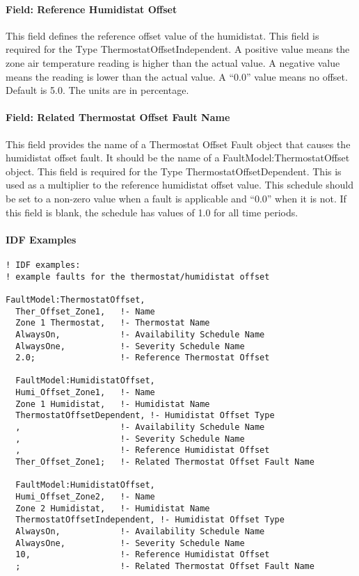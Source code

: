 \paragraph{Field: Reference Humidistat Offset}\label{field-reference-humidistat-offset}

This field defines the reference offset value of the humidistat. This field is required for the Type ThermostatOffsetIndependent. A positive value means the zone air temperature reading is higher than the actual value. A negative value means the reading is lower than the actual value. A ``0.0'' value means no offset. Default is 5.0. The units are in percentage.

\paragraph{Field: Related Thermostat Offset Fault Name}\label{field-related-thermostat-offset-fault-name}

This field provides the name of a Thermostat Offset Fault object that causes the humidistat offset fault. It should be the name of a FaultModel:ThermostatOffset object. This field is required for the Type ThermostatOffsetDependent. This is used as a multiplier to the reference humidistat offset value. This schedule should be set to a non-zero value when a fault is applicable and ``0.0'' when it is not. If this field is blank, the schedule has values of 1.0 for all time periods.

\paragraph{IDF Examples}\label{an-example-of-idf-codes-for-the-thermostathumidistat-offset-fault-models}

\begin{lstlisting}
! IDF examples:
! example faults for the thermostat/humidistat offset

FaultModel:ThermostatOffset,
  Ther_Offset_Zone1,   !- Name
  Zone 1 Thermostat,   !- Thermostat Name
  AlwaysOn,            !- Availability Schedule Name
  AlwaysOne,           !- Severity Schedule Name
  2.0;                 !- Reference Thermostat Offset

  FaultModel:HumidistatOffset, 
  Humi_Offset_Zone1,   !- Name
  Zone 1 Humidistat,   !- Humidistat Name
  ThermostatOffsetDependent, !- Humidistat Offset Type
  ,                    !- Availability Schedule Name
  ,                    !- Severity Schedule Name
  ,                    !- Reference Humidistat Offset
  Ther_Offset_Zone1;   !- Related Thermostat Offset Fault Name

  FaultModel:HumidistatOffset, 
  Humi_Offset_Zone2,   !- Name
  Zone 2 Humidistat,   !- Humidistat Name
  ThermostatOffsetIndependent, !- Humidistat Offset Type
  AlwaysOn,            !- Availability Schedule Name
  AlwaysOne,           !- Severity Schedule Name
  10,                  !- Reference Humidistat Offset
  ;                    !- Related Thermostat Offset Fault Name
\end{lstlisting}

